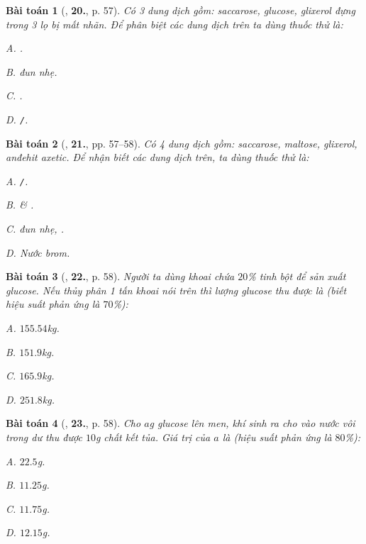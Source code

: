 \documentclass{article}
\numberwithin{equation}{section}
\newtheorem{baitoan}{Bài toán}[section]
\begin{document}
\begin{baitoan}[\cite{An2008}, \textbf{20.}, p. 57]
	Có 3 dung dịch gồm: saccarose, glucose, glixerol đựng trong 3 lọ bị mất nhãn. Để phân biệt các dung dịch trên ta dùng thuốc thử là:
	\begin{enumerate*}
		\item[{\rm\sf A.}] \emph{}.
		\item[{\rm\sf B.}] \emph{} đun nhẹ.
		\item[{\rm\sf C.}] \emph{}.
		\item[{\rm\sf D.}] \emph{\texttt{/}}.
	\end{enumerate*}
\end{baitoan}

\begin{baitoan}[\cite{An2008}, \textbf{21.}, pp. 57--58]
	Có 4 dung dịch gồm: saccarose, maltose, glixerol, anđehit axetic. Để nhận biết các dung dịch trên, ta dùng thuốc thử là:
	\begin{enumerate*}
		\item[{\rm\sf A.}] \emph{\texttt{/}\ce{NH3}}.
		\item[{\rm\sf B.}] \emph{} \& \emph{\ce{[Ag(NH3)2]OH}}.
		\item[{\rm\sf C.}] \emph{} đun nhẹ, \emph{\ce{Cu(OH)2}}.
		\item[{\rm\sf D.}] Nước brom.
	\end{enumerate*}
\end{baitoan}

\begin{baitoan}[\cite{An2008}, \textbf{22.}, p. 58]
	Người ta dùng khoai chứa $20$\% tinh bột để sản xuất glucose. Nếu thủy phân 1 tấn khoai nói trên thì lượng glucose thu được là (biết hiệu suất phản ứng là $70$\%):
	\begin{enumerate*}
		\item[{\rm\sf A.}] $155.54$\emph{kg}.
		\item[{\rm\sf B.}] $151.9$\emph{kg}.
		\item[{\rm\sf C.}] $165.9$\emph{kg}.
		\item[{\rm\sf D.}] $251.8$\emph{kg}.
	\end{enumerate*}
\end{baitoan}	

\begin{baitoan}[\cite{An2008}, \textbf{23.}, p. 58]
	Cho $a$\emph{g} glucose lên men, khí \emph{} sinh ra cho vào nước vôi trong dư thu được $10$\emph{g} chất kết tủa. Giá trị của $a$ là (hiệu suất phản ứng là $80$\%):
	\begin{enumerate*}
		\item[{\rm\sf A.}] $22.5$\emph{g}.
		\item[{\rm\sf B.}] $11.25$\emph{g}.
		\item[{\rm\sf C.}] $11.75$\emph{g}.
		\item[{\rm\sf D.}] $12.15$\emph{g}.
	\end{enumerate*}
\end{baitoan}
\end{document}
